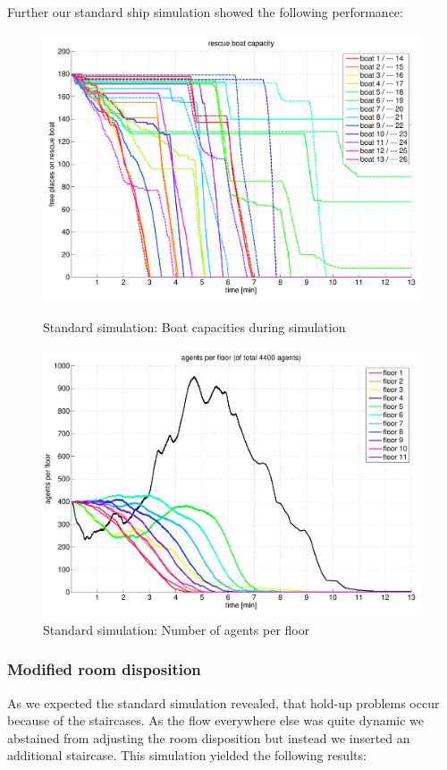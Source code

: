 \documentclass[11pt]{article}
\begin{document}
Further our standard ship simulation showed the following performance:

\begin{figure}[htbp]
\centering
{\begin{minipage}[t]{7.4cm}
\includegraphics[width=\textwidth]{run1-standard-rescueboatcapacity.pdf}
\caption{Standard simulation: Boat capacities during simulation}
\end{minipage}}
{\begin{minipage}[t]{7.4cm}
\includegraphics[width=\textwidth]{run1-standard-agentsperfloor.pdf}
\caption{Standard simulation: Number of agents per floor}
\end{minipage}}
\end{figure}

\subsubsection{Modified room disposition}
As we expected the standard simulation revealed, that hold-up problems occur because of the staircases. As the flow everywhere else was quite dynamic we abstained from adjusting the room disposition but instead we inserted an additional staircase. This simulation yielded the following results:
\end{document}
